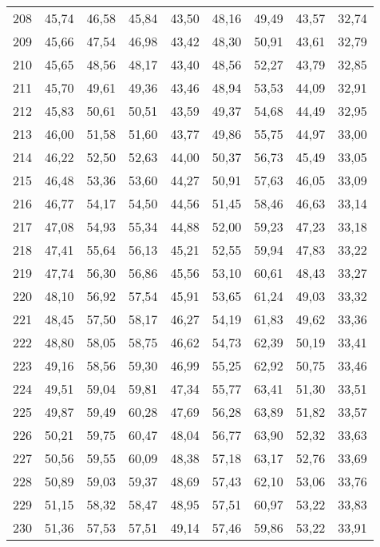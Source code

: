 \begin{longtable}{c c c c c c c c c}
      208& 	45,74& 	46,58& 	45,84& 	43,50& 	48,16& 	49,49& 	43,57& 	32,74 \\
      209& 	45,66& 	47,54& 	46,98& 	43,42& 	48,30& 	50,91& 	43,61& 	32,79 \\
      210& 	45,65& 	48,56& 	48,17& 	43,40& 	48,56& 	52,27& 	43,79& 	32,85 \\
      211& 	45,70& 	49,61& 	49,36& 	43,46& 	48,94& 	53,53& 	44,09& 	32,91 \\
      212& 	45,83& 	50,61& 	50,51& 	43,59& 	49,37& 	54,68& 	44,49& 	32,95 \\
      213& 	46,00& 	51,58& 	51,60& 	43,77& 	49,86& 	55,75& 	44,97& 	33,00 \\
      214& 	46,22& 	52,50& 	52,63& 	44,00& 	50,37& 	56,73& 	45,49& 	33,05 \\
      215& 	46,48& 	53,36& 	53,60& 	44,27& 	50,91& 	57,63& 	46,05& 	33,09 \\
      216& 	46,77& 	54,17& 	54,50& 	44,56& 	51,45& 	58,46& 	46,63& 	33,14 \\
      217& 	47,08& 	54,93& 	55,34& 	44,88& 	52,00& 	59,23& 	47,23& 	33,18 \\
      218& 	47,41& 	55,64& 	56,13& 	45,21& 	52,55& 	59,94& 	47,83& 	33,22 \\
      219& 	47,74& 	56,30& 	56,86& 	45,56& 	53,10& 	60,61& 	48,43& 	33,27 \\
      220& 	48,10& 	56,92& 	57,54& 	45,91& 	53,65& 	61,24& 	49,03& 	33,32 \\
      221& 	48,45& 	57,50& 	58,17& 	46,27& 	54,19& 	61,83& 	49,62& 	33,36 \\
      222& 	48,80& 	58,05& 	58,75& 	46,62& 	54,73& 	62,39& 	50,19& 	33,41 \\
      223& 	49,16& 	58,56& 	59,30& 	46,99& 	55,25& 	62,92& 	50,75& 	33,46 \\
      224& 	49,51& 	59,04& 	59,81& 	47,34& 	55,77& 	63,41& 	51,30& 	33,51 \\
      225& 	49,87& 	59,49& 	60,28& 	47,69& 	56,28& 	63,89& 	51,82& 	33,57 \\
      226& 	50,21& 	59,75& 	60,47& 	48,04& 	56,77& 	63,90& 	52,32& 	33,63 \\
      227& 	50,56& 	59,55& 	60,09& 	48,38& 	57,18& 	63,17& 	52,76& 	33,69 \\
      228& 	50,89& 	59,03& 	59,37& 	48,69& 	57,43& 	62,10& 	53,06& 	33,76 \\
      229& 	51,15& 	58,32& 	58,47& 	48,95& 	57,51& 	60,97& 	53,22& 	33,83 \\
      230& 	51,36& 	57,53& 	57,51& 	49,14& 	57,46& 	59,86& 	53,22& 	33,91 \\

\end{longtable}
